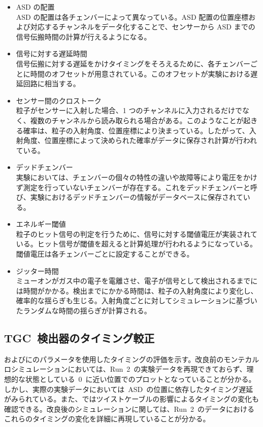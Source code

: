 \begin{itemize}
\item ASD の配置\\
ASD の配置は各チェンバーによって異なっている。ASD 配置の位置座標および対応するチャンネルをデータ化することで、センサーから ASD までの信号伝搬時間の計算が行えるようになる。
\item 信号に対する遅延時間\\
信号伝搬に対する遅延をかけタイミングをそろえるために、各チェンバーごとに時間のオフセットが用意されている。このオフセットが実験における遅延回路に相当する。
\item センサー間のクロストーク\\
粒子がセンサーに入射した場合、1 つのチャンネルに入力されるだけでなく、複数のチャンネルから読み取られる場合がある。このようなことが起きる確率は、粒子の入射角度、位置座標により決まっている。したがって、入射角度、位置座標によって決められた確率がデータに保存され計算が行われている。
\item デッドチェンバー\\
実験においては、チェンバーの個々の特性の違いや故障等により電圧をかけず測定を行っていないチェンバーが存在する。これをデッドチェンバーと呼び、実験におけるデッドチェンバーの情報がデータベースに保存されている。
\item エネルギー閾値\\
粒子のヒット信号の判定を行うために、信号に対する閾値電圧が実装されている。ヒット信号が閾値を超えると計算処理が行われるようになっている。閾値電圧は各チェンバーごとに設定することができる。
\item ジッター時間\\
ミューオンがガス中の電子を電離させ、電子が信号として検出されるまでには時間がかかる。検出までにかかる時間は、粒子の入射角度により変化し、確率的な揺らぎも生じる。入射角度ごとに対してシミュレーションに基づいたランダムな時間の揺らぎが計算される。
\end{itemize}

\subsection{TGC~検出器のタイミング較正}\label{subsec:cali}
およびにのパラメータを使用したタイミングの評価を示す。改良前のモンテカルロシミュレーションにおいては、Run~2~の実験データを再現できておらず、理想的な状態としている~0~に近い位置でのプロットとなっていることが分かる。しかし、実際の実験データにおいては~ASD~の位置に依存したタイミング遅延がみられている。また、ではツイストケーブルの影響によるタイミングの変化も確認できる。改良後のシミュレーションに関しては、Run~2~のデータにおけるこれらのタイミングの変化を詳細に再現していることが分かる。

